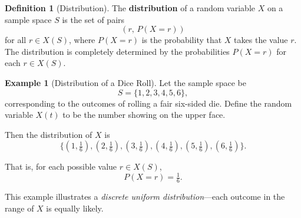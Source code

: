 \documentclass[letterpaper,10pt]{article}
\theoremstyle{plain}
\theoremstyle{definition}
\newtheorem{defn}[thm]{Definition}
\newtheorem{exmp}[thm]{Example}
\theoremstyle{remark}
\begin{document}
\begin{defn}[Distribution]
The \textbf{distribution} of a random variable \(X\) on a sample space \(S\) is the set of pairs 
\[
(r,\, P(X = r))
\]
for all \(r \in X(S)\), where \(P(X = r)\) is the probability that \(X\) takes the value \(r\). 
The distribution is completely determined by the probabilities \(P(X = r)\) for each \(r \in X(S)\).
\end{defn}



\begin{exmp}[Distribution of a Dice Roll]
Let the sample space be
\[
S = \{1, 2, 3, 4, 5, 6\},
\]
corresponding to the outcomes of rolling a fair six-sided die.  
Define the random variable \(X(t)\) to be the number showing on the upper face.

Then the distribution of \(X\) is
\[
\{(1, \tfrac{1}{6}), (2, \tfrac{1}{6}), (3, \tfrac{1}{6}), (4, \tfrac{1}{6}), (5, \tfrac{1}{6}), (6, \tfrac{1}{6})\}.
\]

That is, for each possible value \(r \in X(S)\),
\[
P(X = r) = \tfrac{1}{6}.
\]

This example illustrates a \emph{discrete uniform distribution}—each outcome in the range of \(X\) is equally likely.
\newline
\vspace{1cm}
\end{exmp}
\end{document}
